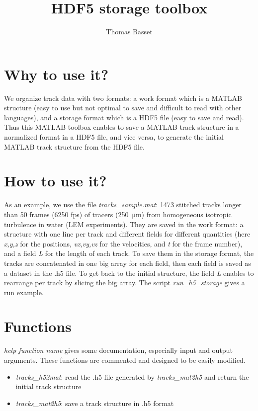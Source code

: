 \documentclass{article}
\title{HDF5 storage toolbox}
\author{Thomas Basset}
\begin{document}
\maketitle

\section{Why to use it?}
We organize track data with two formats: a work format which is a MATLAB structure (easy to use but not optimal to save and difficult to read with other languages), and a storage format which is a HDF5 file (easy to save and read). Thus this MATLAB toolbox enables to save a MATLAB track structure in a normalized format in a HDF5 file, and vice versa, to generate the initial MATLAB track structure from the HDF5 file.

\section{How to use it?}
As an example, we use the file \textit{tracks\_sample.mat}: 1473 stitched tracks longer than 50 frames (6250 fps) of tracers (\SI{250}{\micro\meter}) from homogeneous isotropic turbulence in water (LEM experiments). They are saved in the work format: a structure with one line per track and different fields for different quantities (here \textit{x,y,z} for the positions, \textit{vx,vy,vz} for the velocities, and \textit{t} for the frame number), and a field \textit{L} for the length of each track. To save them in the storage format, the tracks are concatenated in one big array for each field, then each field is saved as a dataset in the .h5 file. To get back to the initial structure, the field \textit{L} enables to rearrange per track by slicing the big array. The script \textit{run\_h5\_storage} gives a run example.

\section{Functions}
\textit{help function name} gives some documentation, especially input and output arguments. These functions are commented and designed to be easily modified.
\begin{itemize}
\item \textit{tracks\_h52mat}: read the .h5 file generated by \textit{tracks\_mat2h5} and return the initial track structure
\item \textit{tracks\_mat2h5}: save a track structure in .h5 format
\end{itemize}
\end{document}

